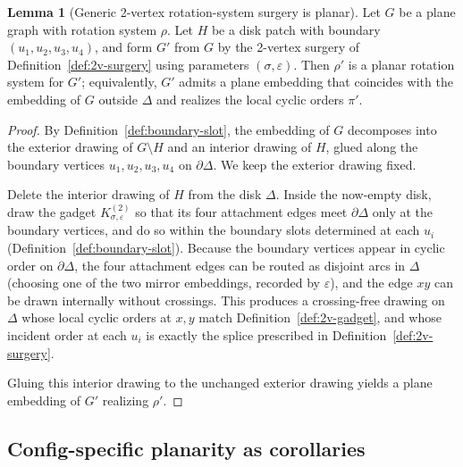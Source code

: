 \documentclass[12pt]{article}
\theoremstyle{definition}
\newtheorem{lemma}[theorem]{Lemma}
\newcommand{\RefinedCFourGadgetVertices}{2}
\begin{document}
\begin{lemma}[Generic \RefinedCFourGadgetVertices-vertex rotation-system surgery is planar]
\label{lem:generic-2v-planarity}
Let $G$ be a plane graph with rotation system $\rho$.
Let $H$ be a disk patch with boundary $(u_1,u_2,u_3,u_4)$, and form $G'$ from $G$ by the \RefinedCFourGadgetVertices-vertex surgery
of Definition~\ref{def:2v-surgery} using parameters $(\sigma,\varepsilon)$.
Then $\rho'$ is a planar rotation system for $G'$; equivalently, $G'$ admits a plane embedding that coincides
with the embedding of $G$ outside $\Delta$ and realizes the local cyclic orders $\pi'$.
\end{lemma}

\begin{proof}
By Definition~\ref{def:boundary-slot}, the embedding of $G$ decomposes into the exterior drawing
of $G\setminus H$ and an interior drawing of $H$, glued along the boundary vertices $u_1,u_2,u_3,u_4$ on $\partial\Delta$.
We keep the exterior drawing fixed.

Delete the interior drawing of $H$ from the disk $\Delta$.
Inside the now-empty disk, draw the gadget $K^{(2)}_{\sigma,\varepsilon}$ so that its four attachment edges meet
$\partial\Delta$ only at the boundary vertices, and do so within the boundary slots determined at each $u_i$
(Definition~\ref{def:boundary-slot}).
Because the boundary vertices appear in cyclic order on $\partial\Delta$, the four attachment edges can be routed
as disjoint arcs in $\Delta$ (choosing one of the two mirror embeddings, recorded by $\varepsilon$), and the edge $xy$
can be drawn internally without crossings.
This produces a crossing-free drawing on $\Delta$ whose local cyclic orders at $x,y$ match
Definition~\ref{def:2v-gadget}, and whose incident order at each $u_i$ is exactly the splice prescribed in
Definition~\ref{def:2v-surgery}.

Gluing this interior drawing to the unchanged exterior drawing yields a plane embedding of $G'$ realizing $\rho'$.
\end{proof}


\subsection{Config-specific planarity as corollaries}
\label{subsec:config-planarity-cor}
\end{document}
